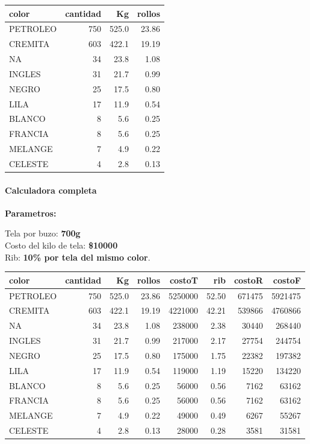 \documentclass[
]{article}
\begin{document}
\begin{longtable}[t]{lrrr}
\toprule
color & cantidad & Kg & rollos\\
\midrule
PETROLEO & 750 & 525.0 & 23.86\\
CREMITA & 603 & 422.1 & 19.19\\
NA & 34 & 23.8 & 1.08\\
INGLES & 31 & 21.7 & 0.99\\
NEGRO & 25 & 17.5 & 0.80\\
\addlinespace
LILA & 17 & 11.9 & 0.54\\
BLANCO & 8 & 5.6 & 0.25\\
FRANCIA & 8 & 5.6 & 0.25\\
MELANGE & 7 & 4.9 & 0.22\\
CELESTE & 4 & 2.8 & 0.13\\
\bottomrule
\end{longtable}

\hypertarget{calculadora-completa}{%
\paragraph{Calculadora completa}\label{calculadora-completa}}

\textbf{Parametros:}

Tela por buzo: \textbf{700g}\\
Costo del kilo de tela: \textbf{\$10000}\\
Rib: \textbf{10\% por tela del mismo color}.

\begin{longtable}[t]{lrrrrrrr}
\toprule
color & cantidad & Kg & rollos & costoT & rib & costoR & costoF\\
\midrule
PETROLEO & 750 & 525.0 & 23.86 & 5250000 & 52.50 & 671475 & 5921475\\
CREMITA & 603 & 422.1 & 19.19 & 4221000 & 42.21 & 539866 & 4760866\\
NA & 34 & 23.8 & 1.08 & 238000 & 2.38 & 30440 & 268440\\
INGLES & 31 & 21.7 & 0.99 & 217000 & 2.17 & 27754 & 244754\\
NEGRO & 25 & 17.5 & 0.80 & 175000 & 1.75 & 22382 & 197382\\
\addlinespace
LILA & 17 & 11.9 & 0.54 & 119000 & 1.19 & 15220 & 134220\\
BLANCO & 8 & 5.6 & 0.25 & 56000 & 0.56 & 7162 & 63162\\
FRANCIA & 8 & 5.6 & 0.25 & 56000 & 0.56 & 7162 & 63162\\
MELANGE & 7 & 4.9 & 0.22 & 49000 & 0.49 & 6267 & 55267\\
CELESTE & 4 & 2.8 & 0.13 & 28000 & 0.28 & 3581 & 31581\\
\bottomrule
\end{longtable}
\end{document}
